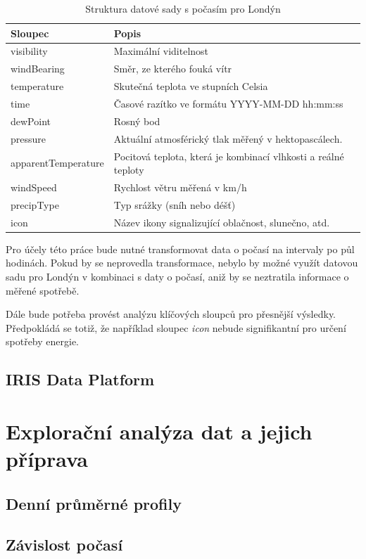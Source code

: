 \documentclass[FM,BP,fonts]{tulthesis}
\begin{document}
\begin{table}[!ht]
	\centering
	\caption{Struktura datové sady s počasím pro Londýn}
	\begin{tabular}{ll}
		\hline
		\textbf{Sloupec} & \textbf{Popis} \\ \hline
		visibility & Maximální viditelnost \\ 
		windBearing & Směr, ze kterého fouká vítr \\ 
		temperature & Skutečná teplota ve stupních Celsia \\ 
		time & Časové razítko ve formátu YYYY-MM-DD hh:mm:ss	 \\ 
		dewPoint & Rosný bod \\ 
		pressure & Aktuální atmosférický tlak měřený v hektopascálech. \\ 
		apparentTemperature & Pocitová teplota, která je kombinací vlhkosti a reálné teploty \\ 
		windSpeed & Rychlost větru měřená v km/h \\ 
		precipType & Typ srážky (sníh nebo déšť) \\
		icon & Název ikony signalizující oblačnost, slunečno, atd.  \\ 
		\hline
	\end{tabular}
\end{table}

Pro účely této práce bude nutné transformovat data o počasí na intervaly po půl hodinách. Pokud by se neprovedla transformace, nebylo by možné využít datovou sadu pro Londýn v kombinaci s daty o počasí, aniž by se neztratila informace o měřené spotřebě.

Dále bude potřeba provést analýzu klíčových sloupců pro přesnější výsledky. Předpokládá se totiž, že například sloupec \textit{icon} nebude signifikantní pro určení spotřeby energie.
\newpage
\subsection{IRIS Data Platform}

\newpage
\section{Explorační analýza dat a jejich příprava}
\subsection{Denní průměrné profily}
\subsection{Závislost počasí}
\end{document}

